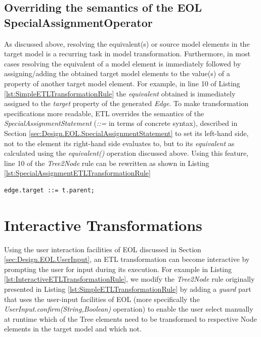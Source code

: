 \subsection{Overriding the semantics of the EOL SpecialAssignmentOperator}
\label{sec:Design.ETL.SpecialAssignmentOperator}

As discussed above, resolving the equivalent(s) or source model elements in the target model is a recurring task in model transformation. Furthermore, in most cases resolving the equivalent of a model element is immediately followed by assigning/adding the obtained target model elements to the value(s) of a property of another target model element. For example, in line 10 of Listing \ref{lst:SimpleETLTransformationRule} the \emph{equivalent} obtained is immediately assigned to the \emph{target} property of the generated \emph{Edge}. To make transformation specifications more readable, ETL overrides the semantics of the \emph{SpecialAssignmentStatement} (\emph{::=} in terms of concrete syntax), described in Section \ref{sec:Design.EOL.SpecialAssignmentStatement} to set its left-hand side, not to the element its right-hand side evaluates to, but to its \emph{equivalent} as calculated using the \emph{equivalent()} operation discussed above. Using this feature, line 10 of the \emph{Tree2Node} rule can be rewritten as shown in Listing \ref{lst:SpecialAssignmentETLTransformationRule}

\begin{lstlisting}[caption=Rewritten Line 10 of the \emph{Tree2Node} Rule Demonstrated in Listing \ref{lst:SimpleETLTransformationRule}, label=lst:SpecialAssignmentETLTransformationRule, language=ETL]
edge.target ::= t.parent;
\end{lstlisting}


\section{Interactive Transformations}
\label{sec:InteractiveModelTransformation}

Using the user interaction facilities of EOL discussed in Section \ref{sec:Design.EOL.UserInput}, an ETL transformation can become interactive by prompting the user for input during its execution. For example in Listing \ref{lst:InteractiveETLTransformationRule}, we modify the \emph{Tree2Node} rule originally presented in Listing \ref{lst:SimpleETLTransformationRule} by adding a \emph{guard} part that uses the user-input facilities of EOL (more specifically the \emph{UserInput.confirm(String,Boolean)} operation) to enable the user select manually at runtime which of the Tree elements need to be transformed to respective Node elements in the target model and which not. 

